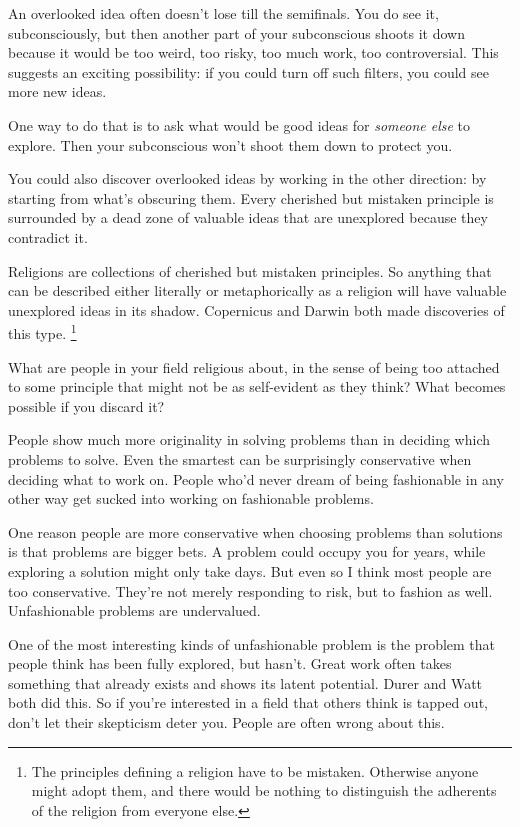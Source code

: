 \documentclass[12pt]{book}
\begin{document}
An overlooked idea often doesn't lose till the semifinals. You do see
it, subconsciously, but then another part of your subconscious shoots it
down because it would be too weird, too risky, too much work, too
controversial. This suggests an exciting possibility: if you could turn
off such filters, you could see more new ideas.

One way to do that is to ask what would be good ideas for \emph{someone
else} to explore. Then your subconscious won't shoot them down to
protect you.

You could also discover overlooked ideas by working in the other
direction: by starting from what's obscuring them. Every cherished but
mistaken principle is surrounded by a dead zone of valuable ideas that
are unexplored because they contradict it.

Religions are collections of cherished but mistaken principles. So
anything that can be described either literally or metaphorically as a
religion will have valuable unexplored ideas in its shadow. Copernicus
and Darwin both made discoveries of this type. \footnote{The principles defining a religion have to be mistaken.
Otherwise anyone might adopt them, and there would be nothing to
distinguish the adherents of the religion from everyone else.}

What are people in your field religious about, in the sense of being too
attached to some principle that might not be as self-evident as they
think? What becomes possible if you discard it?

People show much more originality in solving problems than in deciding
which problems to solve. Even the smartest can be surprisingly
conservative when deciding what to work on. People who'd never dream of
being fashionable in any other way get sucked into working on
fashionable problems.

One reason people are more conservative when choosing problems than
solutions is that problems are bigger bets. A problem could occupy you
for years, while exploring a solution might only take days. But even so
I think most people are too conservative. They're not merely responding
to risk, but to fashion as well. Unfashionable problems are undervalued.

One of the most interesting kinds of unfashionable problem is the
problem that people think has been fully explored, but hasn't. Great
work often takes something that already exists and shows its latent
potential. Durer and Watt both did this. So if you're interested in a
field that others think is tapped out, don't let their skepticism deter
you. People are often wrong about this.
\end{document}
